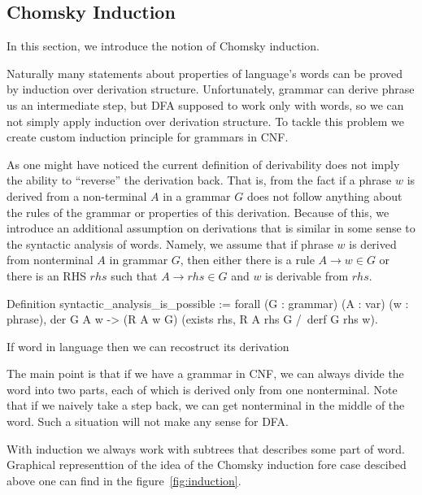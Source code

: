 \subsection{Chomsky Induction}
\label{sec:chomsky-induction}

In this section, we introduce the notion of Chomsky induction.

Naturally many statements about properties of language's words can be proved by induction over derivation structure. Unfortunately, grammar can derive phrase us an intermediate step, but DFA supposed to work only with words, so we can not simply apply induction over derivation structure. To tackle this problem we create custom induction principle for grammars in CNF.

As one might have noticed the current definition of derivability does not imply the ability to ``reverse'' the derivation back. That is, from the fact if a phrase $w$ is derived from a non-terminal $A$ in a grammar $G$ does not follow anything about the rules of the grammar or properties of this derivation. Because of this, we introduce an additional assumption on derivations that is similar in some sense to the syntactic analysis of words.
Namely, we assume that if phrase $w$ is derived from nonterminal $A$ in grammar $G$, then either there is a rule $A \to w \in G$ or there is an RHS $rhs$ such that $A \to rhs \in G$ and $w$ is derivable from $rhs$.

\begin{listing}[h]
    \begin{pyglist}[language=coq, numbers=none, numbersep=5pt]
Definition syntactic_analysis_is_possible :=
  forall (G : grammar) (A : var) (w : phrase),
  der G A w ->
   (R A w \in G) \/ 
   (exists rhs, R A rhs \in G /\ derf G rhs w).
  
  \end{pyglist}
    \caption{If word in language then we can recostruct its derivation}
    \label{lst:synt-analysis-is-possible}
\end{listing}

The main point is that if we have a grammar in CNF, we can always divide the word into two parts, each of which is derived only from one nonterminal. Note that if we naively take a step back, we can get nonterminal in the middle of the word. Such a situation will not make any sense for DFA.

With induction we always work with subtrees that describes some part of word.
Graphical representtion of the idea of the Chomsky induction fore case descibed above one can find in the figure~\ref{fig:induction}.

